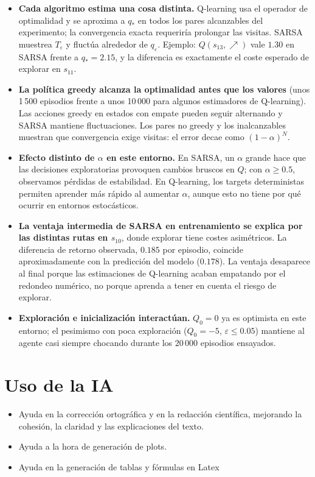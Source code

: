\documentclass[11pt,a4paper]{article}
\newcommand{\UR}{{\nearrow}}
\newcommand{\qe}{q_\varepsilon}
\begin{document}
\begin{itemize}\itemsep1pt

\item \textbf{Cada algoritmo estima una cosa distinta.} Q-learning usa el operador de optimalidad y se aproxima a $q_*$ en todos los pares alcanzables del experimento; la convergencia exacta requeriría prolongar las visitas. SARSA muestrea $T_\varepsilon$ y fluctúa alrededor de $\qe$. Ejemplo: $Q(s_{13},\UR)$ vale $1.30$ en SARSA frente a $q_*=2.15$, y la diferencia es exactamente el coste esperado de explorar en $s_{11}$.

\item \textbf{La política greedy alcanza la optimalidad antes que los valores} (unos 1\,500 episodios frente a unos 10\,000 para algunos estimadores de Q-learning). Las acciones greedy en estados con empate pueden seguir alternando y SARSA mantiene fluctuaciones. Los pares no greedy y los inalcanzables muestran que convergencia exige visitas: el error decae como $(1-\alpha)^N$.

\item \textbf{Efecto distinto de $\alpha$ en este entorno.} En SARSA, un $\alpha$ grande hace que las decisiones exploratorias provoquen cambios bruscos en $Q$; con $\alpha\ge0.5$, observamos pérdidas de estabilidad. En Q-learning, los targets deterministas permiten aprender más rápido al aumentar $\alpha$, aunque esto no tiene por qué ocurrir en entornos estocásticos.

\item \textbf{La ventaja intermedia de SARSA en entrenamiento se explica por las distintas rutas en $s_{10}$}, donde explorar tiene costes asimétricos. La diferencia de retorno observada, $0.185$ por episodio, coincide aproximadamente con la predicción del modelo ($0.178$). La ventaja desaparece al final porque las estimaciones de Q-learning acaban empatando por el redondeo numérico, no porque aprenda a tener en cuenta el riesgo de explorar.

\item \textbf{Exploración e inicialización interactúan.} $Q_0=0$ ya es optimista en este entorno; el pesimismo con poca exploración ($Q_0=-5$, $\varepsilon\le0.05$) mantiene al agente casi siempre chocando durante los $20\,000$ episodios ensayados.

\end{itemize}



\section{Uso de la IA}

\begin{itemize}\itemsep1pt

    \item Ayuda en la corrección ortográfica y en la redacción científica, mejorando la cohesión, la claridad y las explicaciones del texto.

    \item Ayuda a la hora de generación de plots.

    \item Ayuda en la generación de tablas y fórmulas en Latex

\end{itemize}
\end{document}
